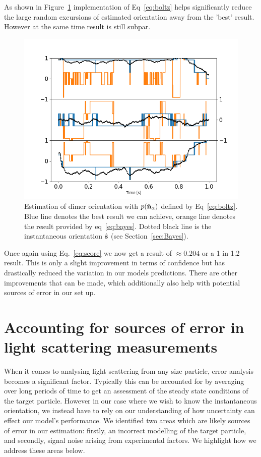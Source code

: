 As shown in Figure~\ref{fig:biased} implementation of Eq~\eqref{eq:boltz} helps significantly reduce the large random excursions of estimated orientation away from the 'best' result. However at the same 
time result is still subpar.
\begin{figure}[h]
	\centering
	\includegraphics[width=\textwidth]{fig8a.png}
	\caption{\label{fig:biased}
		Estimation of dimer orientation with $p(\hat{\bf n}_\alpha)$ defined
		by Eq~\eqref{eq:boltz}.  Blue line denotes the best result we can
		achieve, orange line denotes the result provided by eq~\ref{eq:bayes}.
		Dotted black line is the instantaneous orientation $\hat{\bf s}$ (see Section~\ref{sec:Bayes}).
	}
\end{figure} 

Once again using Eq.~\eqref{eq:score} we now get a result of 
$\approx 0.204$ or a 1 in 1.2 result. This is only a slight 
improvement in terms of confidence but has drastically reduced 
the variation in our models predictions. There are other 
improvements that can be made, which additionally also help with
potential sources of error in our set up.

\section{Accounting for sources of error in light scattering measurements}
When it comes to analysing light scattering from any size particle,
error analysis becomes a significant factor. Typically this can be 
accounted for by averaging over long periods of time to get an 
assessment of the steady state conditions of the target particle. 
However in our case where we wish to know the instantaneous 
orientation, we instead have to rely on our understanding of how 
uncertainty can effect our model's performance. We identified two 
areas which are likely sources of error in our estimation: firstly, 
an incorrect modelling of the target particle, and secondly, signal 
noise arising from experimental factors. We highlight how we address 
these areas below. 
